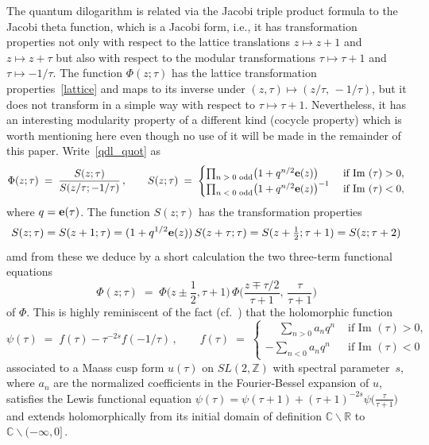 \documentclass[hyper]{JHEP3}
\def\im{\mbox{Im }}
\newcommand{\C}{{\mathbb{C}}}
\newcommand{\R}{{\mathbb{R}}}
\newcommand{\Z}{{\mathbb{Z}}}
\newcommand\be{\begin{equation}}
\newcommand\ee{\end{equation}}
\newcommand\bes{\begin{equation*}}
\newcommand\ees{\end{equation*}}
\def\={\;=\;}
\def\t{\tau}
\def\e{\bold e}
\def\sm{\smallsetminus}
\begin{document}
\smallskip{}  The quantum dilogarithm is related via the Jacobi triple product
formula to the Jacobi theta function, which is a Jacobi form, i.e., it has transformation properties
not only with respect to the lattice translations $z\mapsto z+1$ and $z\mapsto z+\t$ but also with
respect to the modular transformations $\t\mapsto\t+1$ and $\t\mapsto-1/\t$.  The function $\Phi(z;\t)$
has the lattice transformation properties~\eqref{lattice} and maps to its inverse under
$(z,\t)\mapsto(z/\t,\,-1/\t)$, but it does not transform in a simple way with respect
to $\t\mapsto\t+1$.  Nevertheless, it has an interesting modularity property of a different
kind (cocycle property) which is worth mentioning here even though no use of it will be made
in the remainder of this paper.  Write~\eqref{qdl_quot} as
  \bes\label{StoPhi} \Phi(z;\t)\=\frac{S(z;\t)}{S(z/\t;-1/\t)}\,,\qquad S(z;\t)\=\begin{cases}
    \prod_{\text{$n>0$ odd}}\bigl(1+q^{n/2}\e(z)\bigr)&\text{ if $\im(\t)>0$}, \\
    \prod_{\text{$n<0$ odd}}\bigl(1+q^{n/2}\e(z)\bigr)^{-1}&\text{ if $\im(\t)<0$}, \end{cases} \ees
where $q=\e(\t)$.  The function $S(z;\t)$ has the transformation properties
  \bes S(z;\t)=S(z+1;\t)=(1+q^{1/2}\e(z))\,S(z+\t;\t)=S(z+\tfrac12;\t+1)=S(z;\t+2) \ees
amd from these we deduce by a short calculation the two three-term functional equations
 \be \Phi(z;\t)\=\Phi\bigl(z\pm\frac12,\t+1\bigr)\,\Phi\bigl(\frac{z\mp\t/2}{\t+1},\,\frac\t{\t+1}\bigr) \ee
of $\Phi$.  This is highly reminiscent of the fact (cf.~\cite{LewisZag}) that the holomorphic function
  \bes \psi(\t)\=f(\t)-\t^{-2s}f(-1/\t)\,,\qquad f(\t)\=\begin{cases}\phantom{-}
   \sum_{n>0}a_nq^n&\text{ if $\im(\t)>0$,} \\-\sum_{n<0}a_nq^n&\text{ if $\im(\t)<0$} \end{cases} \ees
associated to a Maass cusp form $u(\t)$ on $SL(2,\Z)$ with spectral parameter~$s$, where $a_n$ are the
normalized coefficients in the Fourier-Bessel expansion of $u$, satisfies the Lewis functional equation
$\psi(\t)=\psi(\t+1)+(\t+1)^{-2s}\psi\bigl(\frac\t{\t+1}\bigr)$ and extends holomorphically from its initial
domain of definition $\C\sm\R$ to $\C\sm(-\infty,0]\,$.
\end{document}
